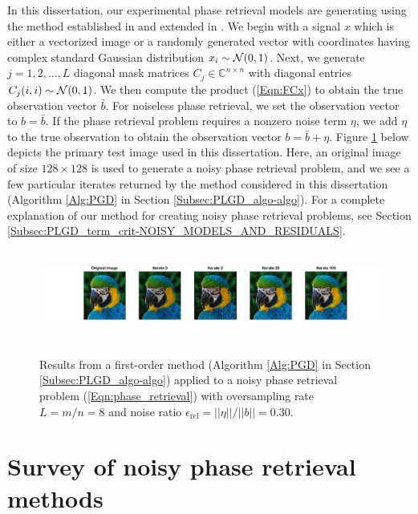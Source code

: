 In this dissertation, our experimental phase retrieval models are generating using the method established in \cite{DBLP:journals/tit/CandesLS15} and extended in \cite{DBLP:journals/siamsc/FriedlanderM16}.  
We begin with a signal $x$ which is either a vectorized image or a randomly generated vector with coordinates having complex standard Gaussian distribution $x_i \sim {\mathcal N}(0, 1)$.
Next, we generate $j = 1, 2, \ldots,  L$ diagonal mask matrices $C_j \in \mathbb{C}^{n \times n}$ with diagonal entries $C_j(i,i) \sim {\mathcal N}(0, 1)$.
We then compute the product (\ref{Eqn:FCx}) to obtain the true observation vector $\bar{b}$.
For noiseless phase retrieval, we set the observation vector to $b = \bar{b}$.
If the phase retrieval problem requires a nonzero noise term $\eta$, we add $\eta$ to the true observation to obtain the observation vector $b = \bar{b} + \eta$.
Figure \ref{Fig:parrot_signal_iterates} below depicts the primary test image used in this dissertation.
Here, an original image of size $128 \times 128$ is used to generate a noisy phase retrieval problem, and we see a few particular iterates returned by the method considered in this dissertation (Algorithm \ref{Alg:PGD} in Section \ref{Subsec:PLGD_algo-algo}).  
For a complete explanation of our method for creating noisy phase retrieval problems, see Section \ref{Subsec:PLGD_term_crit-NOISY_MODELS_AND_RESIDUALS}.

\begin{figure}[H]
\centering
\hbox{\hspace{-2.3cm} \includegraphics[scale=0.55]{parrot_signal_iterates} }
\caption{Results from a first-order method (Algorithm \ref{Alg:PGD} in Section \ref{Subsec:PLGD_algo-algo}) applied to a noisy phase retrieval problem (\ref{Eqn:phase_retrieval}) with oversampling rate $L = m/n=8$ and noise ratio $\epsilon_\text{rel} = ||\eta|| / ||b|| = 0.30$.}
\label{Fig:parrot_signal_iterates}
\end{figure}




\section{Survey of noisy phase retrieval methods}  	\label{Subsec:phase_retrieval-survey_of_methods}

